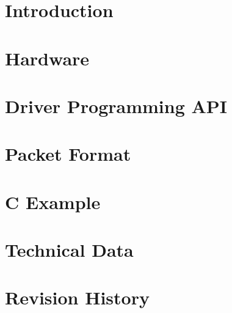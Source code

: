 \documentclass[10pt,notitlepage]{scrreprt}
\begin{document}


 \newpage 
	\thispagestyle{empty}
	\newpage
	\tableofcontents
	\clearpage
	\pagestyle{fancy}
	\chapter{Introduction}
		
	\chapter{Hardware}
		
	\chapter{Driver Programming API}
		
	\chapter{Packet Format\label{cp:packetformat}}
		
	\chapter{C Example}
		
	\chapter{Technical Data}
		
		
	\chapter{Revision History}
		
		
		
\end{document}
